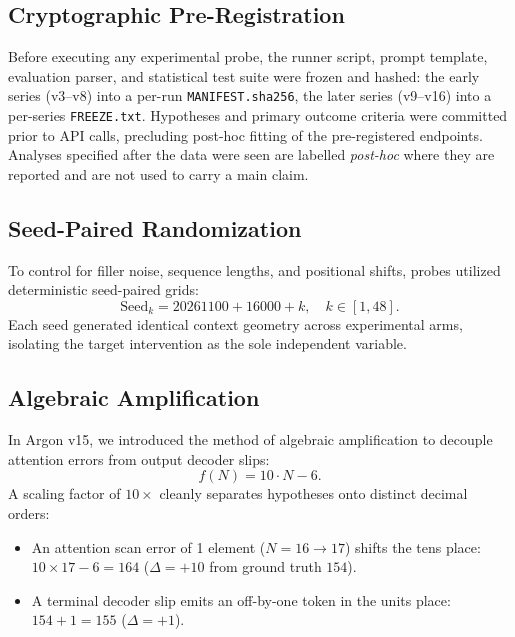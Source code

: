 \documentclass[11pt,a4paper]{article}
\begin{document}
\subsection{Cryptographic Pre-Registration}
Before executing any experimental probe, the runner script, prompt template, evaluation parser, and statistical test suite were frozen and hashed: the early series (v3--v8) into a per-run \texttt{MANIFEST.sha256}, the later series (v9--v16) into a per-series \texttt{FREEZE.txt}. Hypotheses and primary outcome criteria were committed prior to API calls, precluding post-hoc fitting of the pre-registered endpoints. Analyses specified after the data were seen are labelled \emph{post-hoc} where they are reported and are not used to carry a main claim.

\subsection{Seed-Paired Randomization}
To control for filler noise, sequence lengths, and positional shifts, probes utilized deterministic seed-paired grids:
\begin{equation}
    \text{Seed}_k = 20261100 + 16000 + k, \quad k \in [1, 48].
\end{equation}
Each seed generated identical context geometry across experimental arms, isolating the target intervention as the sole independent variable.

\subsection{Algebraic Amplification}
In Argon v15, we introduced the method of algebraic amplification to decouple attention errors from output decoder slips:
\begin{equation}
    f(N) = 10 \cdot N - 6.
\end{equation}
A scaling factor of $10\times$ cleanly separates hypotheses onto distinct decimal orders:
\begin{itemize}
    \item An attention scan error of 1 element ($N=16 \to 17$) shifts the tens place: $10 \times 17 - 6 = 164$ ($\Delta = +10$ from ground truth $154$).
    \item A terminal decoder slip emits an off-by-one token in the units place: $154 + 1 = 155$ ($\Delta = +1$).
\end{itemize}
\end{document}
